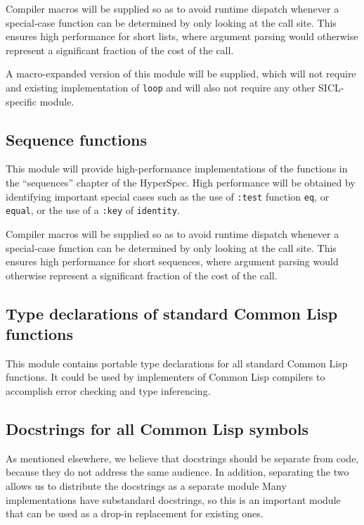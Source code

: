 \documentclass{article}
\def\sysname{SICL}
\begin{document}
Compiler macros will be supplied so as to avoid runtime dispatch
whenever a special-case function can be determined by only looking at
the call site.  This ensures high performance for short lists, where
argument parsing would otherwise represent a significant fraction of
the cost of the call.

A macro-expanded version of this module will be supplied, which will
not require and existing implementation of \texttt{loop} and will also
not require any other \sysname{}-specific module. 

\subsection{Sequence functions}

This module will provide high-performance implementations of the
functions in the ``sequences'' chapter of the HyperSpec.  High
performance will be obtained by identifying important special cases
such as the use of \texttt{:test} function \texttt{eq}, or
\texttt{equal}, or the use of a \texttt{:key} of \texttt{identity}. 

Compiler macros will be supplied so as to avoid runtime dispatch
whenever a special-case function can be determined by only looking at
the call site.  This ensures high performance for short sequences,
where argument parsing would otherwise represent a significant
fraction of the cost of the call.

\subsection{Type declarations of standard Common Lisp functions}

This module contains portable type declarations for all standard
Common Lisp functions.  It could be used by implementers of Common
Lisp compilers to accomplish error checking and type inferencing. 

\subsection{Docstrings for all Common Lisp symbols}

As mentioned elsewhere, we believe that docstrings should be separate
from code, because they do not address the same audience.  In
addition, separating the two allows us to distribute the docstrings as
a separate module Many implementations have substandard docstrings, so
this is an important module that can be used as a drop-in replacement
for existing ones.
\end{document}
